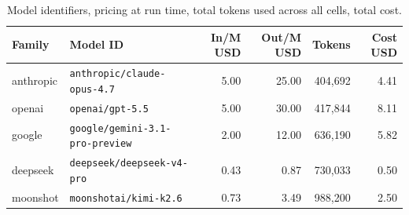 \begin{table}[t]
\centering
\caption{Model identifiers, pricing at run time, total tokens used across all cells, total cost.}
\label{tab:models}
\small
\begin{tabular}{llrrrr}
\toprule
Family & Model ID & In/M USD & Out/M USD & Tokens & Cost USD \\
\midrule
anthropic & \texttt{anthropic/claude-opus-4.7} & 5.00 & 25.00 & 404,692 & 4.41 \\
openai & \texttt{openai/gpt-5.5} & 5.00 & 30.00 & 417,844 & 8.11 \\
google & \texttt{google/gemini-3.1-pro-preview} & 2.00 & 12.00 & 636,190 & 5.82 \\
deepseek & \texttt{deepseek/deepseek-v4-pro} & 0.43 & 0.87 & 730,033 & 0.50 \\
moonshot & \texttt{moonshotai/kimi-k2.6} & 0.73 & 3.49 & 988,200 & 2.50 \\
\bottomrule
\end{tabular}
\end{table}
